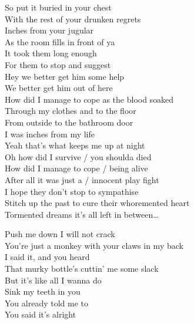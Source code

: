 So put it buried in your chest\\
With the rest of your drunken regrets\\
Inches from your jugular\\
As the room fills in front of ya\\
It took them long enough\\
For them to stop and suggest\\
Hey we better get him some help\\
We better get him out of here\\

How did I manage to cope as the blood soaked\\
Through my clothes and to the floor\\
From outside to the bathroom door\\
I was inches from my life\\
Yeah that's what keeps me up at night\\

Oh how did I survive / you shoulda died\\
How did I manage to cope / being alive\\
After all it was just a / innocent play fight\\
I hope they don't stop to sympathise\\

Stitch up the past to cure their whoremented heart\\

Tormented dreams it's all left in between…\\




Push me down I will not crack\\
You're just a monkey with your claws in my back\\
I said it, and you heard\\
That murky bottle's cuttin' me some slack\\

But it's like all I wanna do\\
Sink my teeth in you\\
You already told me to\\
You said it's alright\\


